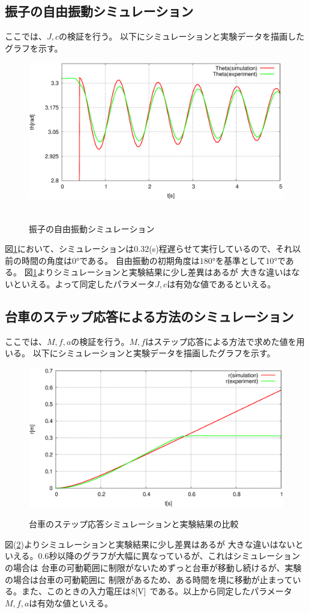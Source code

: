 	\subsection{振子の自由振動シミュレーション}
		ここでは、$J,c$の検証を行う。
		以下にシミュレーションと実験データを描画したグラフを示す。
		\begin{figure}[H]
			\centering
			\includegraphics[width=0.8\linewidth]{gazo/free45Auto.eps}\\　
			\caption{振子の自由振動シミュレーション}
			\label{image:freependulum}
		\end{figure}
		図\ref{image:freependulum}において、シミュレーションは0.32(s)程遅らせて実行しているので、それ以前の時間の角度は$0°$である。
		自由振動の初期角度は$180°$を基準として$10°$である。
		図\ref{image:freependulum}よりシミュレーションと実験結果に少し差異はあるが
		大きな違いはないといえる。よって同定したパラメータ$J,c$は有効な値であるといえる。
		\newpage
	\subsection{台車のステップ応答による方法のシミュレーション}
		ここでは、$M,f,a$の検証を行う。$M,f$はステップ応答による方法で求めた値を用いる。
		以下にシミュレーションと実験データを描画したグラフを示す。
		\begin{figure}[H]
			\centering
			\includegraphics[width=0.8\linewidth]{gazo/nabe8.eps}\\
			\caption{台車のステップ応答シミュレーションと実験結果の比較}
			\label{image:step}
		\end{figure}
		図(\ref{image:step})よりシミュレーションと実験結果に少し差異はあるが
		大きな違いはないといえる。0.6秒以降のグラフが大幅に異なっているが、これはシミュレーションの場合は
		台車の可動範囲に制限がないためずっと台車が移動し続けるが、実験の場合は台車の可動範囲に
		制限があるため、ある時間を境に移動が止まっている。また、このときの入力電圧は$8[\rm{V}]$
		である。以上から同定したパラメータ$M,f,a$は有効な値といえる。
		\newpage
